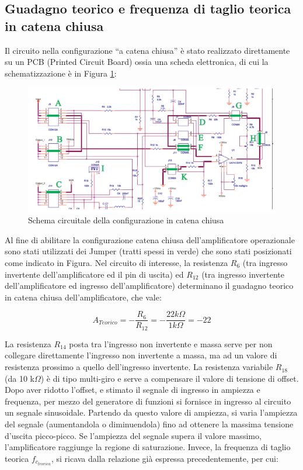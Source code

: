 \subsection{Guadagno teorico e frequenza di taglio teorica in catena chiusa}

Il circuito nella configurazione “a catena chiusa” è stato realizzato direttamente su un PCB (Printed Circuit Board) ossia una scheda elettronica, di cui la schematizzazione è in Figura \ref{fig:schemaCatenaChiusa}:
\begin{figure}[h]
    \centering
    \includegraphics[width=1\linewidth]{media/schemaCircuitaleuA741.png}
    \caption{Schema circuitale della configurazione in catena chiusa}
    \label{fig:schemaCatenaChiusa}
\end{figure}
\FloatBarrier
Al fine di abilitare la configurazione catena chiusa dell'amplificatore operazionale sono stati utilizzati dei Jumper (tratti spessi in verde) che sono stati posizionati come indicato in Figura.
\FloatBarrier
Nel circuito di interesse, la resistenza \(R_6\) (tra ingresso invertente dell’amplificatore ed il pin di uscita) ed \(R_{12}\) (tra ingresso invertente dell’amplificatore ed ingresso dell’amplificatore) determinano il guadagno teorico in catena chiusa dell’amplificatore, che vale:

\[A_{Teorico}=-\frac{R_6}{R_{12}}=-\frac{22 k\Omega}{1 k\Omega}=-22\]

La resistenza \(R_{14}\) posta tra l’ingresso non invertente e massa serve per non collegare direttamente l’ingresso non invertente a massa, ma ad un valore di resistenza prossimo a quello dell’ingresso invertente. La resistenza variabile \(R_{18}\) (da 10 k\(\Omega\)) è di tipo multi-giro e serve a compensare il valore di tensione di offset. Dopo aver ridotto l’offset, e stimato il segnale di ingresso in ampiezza e frequenza, per mezzo del generatore di funzioni si fornisce in ingresso al circuito un segnale sinusoidale. Partendo da questo valore di ampiezza, si varia l’ampiezza del segnale (aumentandola o diminuendola) fino ad ottenere la massima tensione d’uscita picco-picco. Se l’ampiezza del segnale supera il valore massimo, l’amplificatore raggiunge la regione di saturazione.
Invece, la frequenza di taglio teorica \(f_{c_{teorica}}\), si ricava dalla relazione già espressa precedentemente, per cui:

